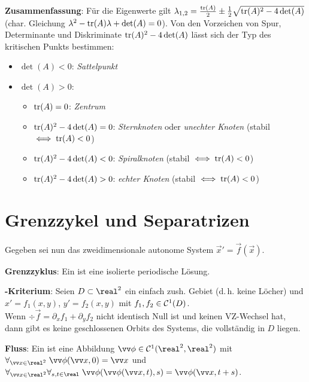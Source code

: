 \textbf{Zusammenfassung}:
Für die Eigenwerte gilt
$\lambda_{1,2} = \frac{\text{tr}(A)}{2} \pm \frac{1}{2} \sqrt{\text{tr}(A)^2 - 4\det(A)}$
(char. Gleichung $\lambda^2 - \text{tr}(A) \lambda + \det(A) = 0$).
Von den Vorzeichen von Spur, Determinante und Diskriminate $\text{tr}(A)^2 - 4\det(A)$ lässt sich der
Typ des kritischen Punkts bestimmen:
\begin{itemize}
    \item
    $\det(A) < 0$: \emph{Sattelpunkt}

    \item
    $\det(A) > 0$:
    \begin{itemize}
        \item
        $\text{tr}(A) = 0$: \emph{Zentrum}

        \item
        $\text{tr}(A)^2 - 4\det(A) = 0$: \emph{Sternknoten} oder \emph{unechter Knoten}
        (stabil $\iff \text{tr}(A) < 0$)

        \item
        $\text{tr}(A)^2 - 4\det(A) < 0$: \emph{Spiralknoten} (stabil $\iff \text{tr}(A) < 0$)

        \item
        $\text{tr}(A)^2 - 4\det(A) > 0$: \emph{echter Knoten} (stabil $\iff \text{tr}(A) < 0$)
    \end{itemize}
\end{itemize}

\pagebreak

\section{%
    Grenzzykel und Separatrizen%
}

Gegeben sei nun das zweidimensionale autonome System $\vec{x}' = \vec{f}(\vec{x})$.

\textbf{Grenzzyklus}:
Ein  ist eine isolierte periodische Lösung.

\textbf{-Kriterium}:
Seien $D \subset \real^2$ ein einfach zush. Gebiet (d.\,h. keine Löcher) und\\
$x' = f_1(x, y)$, $y' = f_2(x, y)$ mit $f_1, f_2 \in \mathcal{C}^1(D)$.\\
Wenn $\div \vec{f} = \partial_x f_1 + \partial_y f_2$ nicht identisch Null ist und
keinen VZ-Wechsel hat, dann gibt es keine geschlossenen Orbits des Systems, die vollständig
in $D$ liegen.

\linie

\textbf{Fluss}:
Ein  ist eine Abbildung $\vec{\phi} \in \C^1(\real^2, \real^2)$ mit
$\forall_{\vec{x} \in \real^2}\; \vec{\phi}(\vec{x}, 0) = \vec{x}$ und\\
$\forall_{\vec{x} \in \real^2} \forall_{s, t \in \real}\;
\vec{\phi}(\vec{\phi}(\vec{x}, t), s) = \vec{\phi}(\vec{x}, t+s)$.

